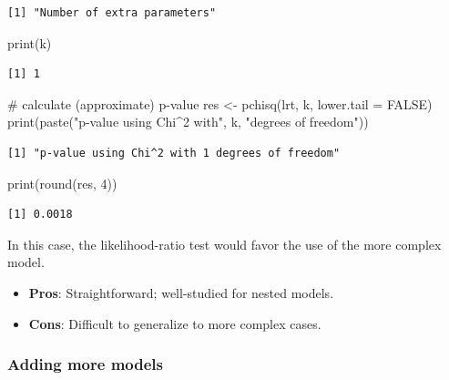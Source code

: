 \documentclass[
  letterpaper,
  DIV=11,
  numbers=noendperiod]{scrreprt}
\newenvironment{Shaded}{\begin{snugshade}}{\end{snugshade}}
\newcommand{\AttributeTok}[1]{\textcolor[rgb]{0.40,0.45,0.13}{#1}}
\newcommand{\CommentTok}[1]{\textcolor[rgb]{0.37,0.37,0.37}{#1}}
\newcommand{\ConstantTok}[1]{\textcolor[rgb]{0.56,0.35,0.01}{#1}}
\newcommand{\DecValTok}[1]{\textcolor[rgb]{0.68,0.00,0.00}{#1}}
\newcommand{\FunctionTok}[1]{\textcolor[rgb]{0.28,0.35,0.67}{#1}}
\newcommand{\NormalTok}[1]{\textcolor[rgb]{0.00,0.23,0.31}{#1}}
\newcommand{\OtherTok}[1]{\textcolor[rgb]{0.00,0.23,0.31}{#1}}
\newcommand{\StringTok}[1]{\textcolor[rgb]{0.13,0.47,0.30}{#1}}
\providecommand{\tightlist}{%
  \setlength{\itemsep}{0pt}\setlength{\parskip}{0pt}}\usepackage{longtable,booktabs,array}
\begin{document}
\begin{verbatim}
[1] "Number of extra parameters"
\end{verbatim}

\begin{Shaded}
\begin{Highlighting}[]
\FunctionTok{print}\NormalTok{(k)}
\end{Highlighting}
\end{Shaded}

\begin{verbatim}
[1] 1
\end{verbatim}

\begin{Shaded}
\begin{Highlighting}[]
\CommentTok{\# calculate (approximate) p{-}value}
\NormalTok{res }\OtherTok{\textless{}{-}} \FunctionTok{pchisq}\NormalTok{(lrt, k, }\AttributeTok{lower.tail =} \ConstantTok{FALSE}\NormalTok{)}
\FunctionTok{print}\NormalTok{(}\FunctionTok{paste}\NormalTok{(}\StringTok{"p{-}value using Chi\^{}2 with"}\NormalTok{, k, }\StringTok{"degrees of freedom"}\NormalTok{))}
\end{Highlighting}
\end{Shaded}

\begin{verbatim}
[1] "p-value using Chi^2 with 1 degrees of freedom"
\end{verbatim}

\begin{Shaded}
\begin{Highlighting}[]
\FunctionTok{print}\NormalTok{(}\FunctionTok{round}\NormalTok{(res, }\DecValTok{4}\NormalTok{))}
\end{Highlighting}
\end{Shaded}

\begin{verbatim}
[1] 0.0018
\end{verbatim}

In this case, the likelihood-ratio test would favor the use of the more
complex model.

\begin{itemize}
\tightlist
\item
  \textbf{Pros}: Straightforward; well-studied for nested models.
\item
  \textbf{Cons}: Difficult to generalize to more complex cases.
\end{itemize}

\hypertarget{adding-more-models}{%
\subsubsection{Adding more models}\label{adding-more-models}}
\end{document}
